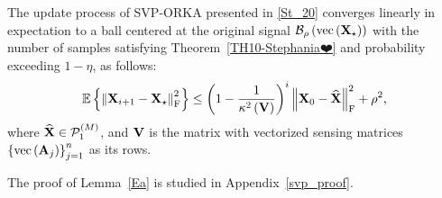 \documentclass[12pt,draftcls,onecolumn]{IEEEtran}
\begin{document}
\begin{lemma}
\label{Ea}
The update process of SVP-ORKA presented in \eqref{St_20} converges linearly in expectation to a ball centered at the original signal
$\mathcal{B}_{\rho}\left(\operatorname{vec}\left(\mathbf{X}_{\star}\right)\right)$ 
with the number of samples satisfying Theorem~\ref{TH10-Stephania❤️} and probability exceeding $1-\eta$, as follows:
\begin{equation}
\label{kvm_19}
\begin{aligned}
\mathbb{E}\left\{\left\|\mbX_{i+1}-\mbX_{\star}\right\|^2_{\mathrm{F}}\right\}\leq\left(1-\frac{1}{\kappa^{2}\left(\mbV\right)}\right)^{i} \left\|\mbX_{0}-\widehat{\mbX}\right\|^2_{\mathrm{F}}+\rho^2,
\end{aligned}   
\end{equation}\normalsize
where $\widehat{\mathbf{X}}\in \mathcal{P}^{(M)}_{1}$,
and $\mathbf{V}$ is the matrix with vectorized sensing matrices $\left\{\operatorname{vec}\left(\mathbf{A}_j\right)\right\}^{n}_{j=1}$ as its rows. 
\end{lemma}
The proof of Lemma~\eqref{Ea} is studied in Appendix~\ref{svp_proof}.

\end{document}
